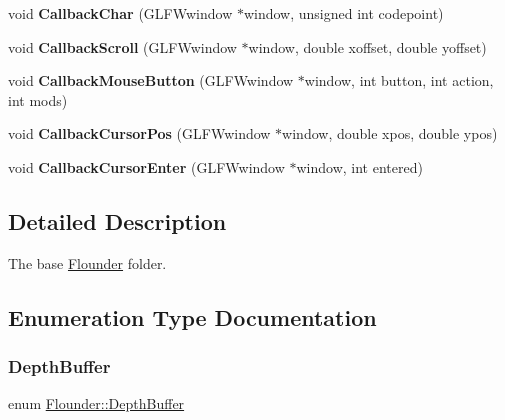 \begin{DoxyCompactItemize}
\item 
\mbox{\label{namespace_flounder_a206896109ba0422099a73bc3aa1b0f4f}} 
void {\bfseries Callback\+Char} (G\+L\+F\+Wwindow $\ast$window, unsigned int codepoint)
\item 
\mbox{\label{namespace_flounder_a1c7686a4b0a83500b2eb1d0a455b0072}} 
void {\bfseries Callback\+Scroll} (G\+L\+F\+Wwindow $\ast$window, double xoffset, double yoffset)
\item 
\mbox{\label{namespace_flounder_ad73cae47d75295dbb6518bcf95c1339a}} 
void {\bfseries Callback\+Mouse\+Button} (G\+L\+F\+Wwindow $\ast$window, int button, int action, int mods)
\item 
\mbox{\label{namespace_flounder_aca07c79ab2b7424cc209667be35ba0be}} 
void {\bfseries Callback\+Cursor\+Pos} (G\+L\+F\+Wwindow $\ast$window, double xpos, double ypos)
\item 
\mbox{\label{namespace_flounder_a49e337cb1d8f62949c3aa0e9f5903317}} 
void {\bfseries Callback\+Cursor\+Enter} (G\+L\+F\+Wwindow $\ast$window, int entered)
\end{DoxyCompactItemize}


\subsection{Detailed Description}
The base \hyperlink{namespace_flounder}{Flounder} folder. 



\subsection{Enumeration Type Documentation}
\mbox{\label{namespace_flounder_aa9068c36d11b70ffe0a222a006304278}} 
\subsubsection{\texorpdfstring{Depth\+Buffer}{DepthBuffer}}
{\footnotesize\ttfamily enum \hyperlink{namespace_flounder_aa9068c36d11b70ffe0a222a006304278}{Flounder\+::\+Depth\+Buffer}}



